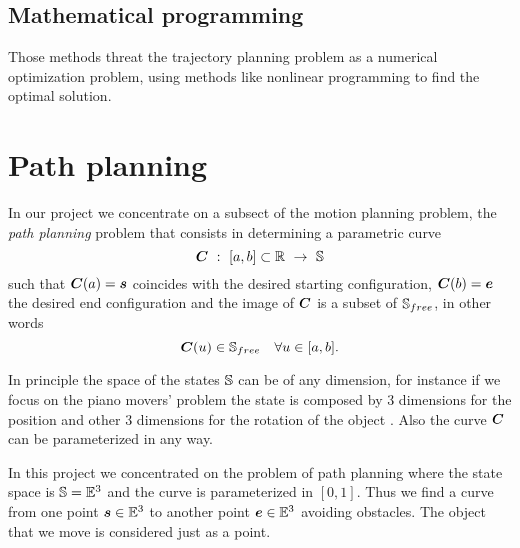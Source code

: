 \documentclass[dissertation.tex]{subfiles}
\begin{document}
\subsection{Mathematical programming}
Those methods threat the trajectory planning problem as a numerical
optimization problem, using methods like nonlinear programming to
find the optimal solution.

\section{Path planning}
In our project we concentrate on a subsect of the motion planning
problem, the \emph{path planning} problem that consists \cite{choset}
in determining a parametric curve
\begin{equation*}
  \ve{C}\ :\ [a,b]\subset\mR\ \rightarrow\ \mS
\end{equation*}
such that $\boldsymbol{C}(a)=\boldsymbol{s}$ coincides with the desired starting
configuration,
$\boldsymbol{C}(b)=\boldsymbol{e}$ the desired end configuration and the image of
$\boldsymbol{C}$ is a
subset of $\mathbb{S}_{free}$, in other words
\begin{equation*}
\boldsymbol{C}(u)\in\mathbb{S}_{free}\quad \forall u\in[a,b].
\end{equation*}

In principle the space of the states $\mathbb{S}$ can be of any dimension,
for instance if we focus on the piano movers' problem the state is
composed by 3 dimensions for the position and other 3 dimensions for
the rotation of the object \cite{lavalle}. Also
the curve $\boldsymbol{C}$ can be parameterized in any way. 

In this project we
concentrated on the problem of
path planning where the state space is $\mathbb{S}=\mathbb{E}^3$ and the curve is
parameterized in $[0,1]$. Thus we find a curve from one point
$\boldsymbol{s}\in\mathbb{E}^3$ to another point $\boldsymbol{e}\in\mathbb{E}^3$ 
avoiding obstacles. The object that we move is considered just as a
point.
\end{document}

